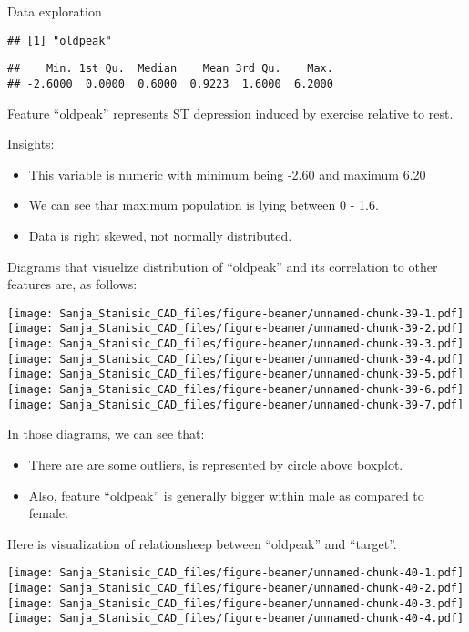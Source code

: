\documentclass[
  ignorenonframetext,
]{beamer}
\begin{document}
\begin{frame}[fragile]{Data exploration}
\begin{verbatim}
## [1] "oldpeak"
\end{verbatim}

\begin{verbatim}
##    Min. 1st Qu.  Median    Mean 3rd Qu.    Max. 
## -2.6000  0.0000  0.6000  0.9223  1.6000  6.2000
\end{verbatim}

Feature ``oldpeak'' represents ST depression induced by exercise
relative to rest.

Insights:

\begin{itemize}
\item
  This variable is numeric with minimum being -2.60 and maximum 6.20
\item
  We can see thar maximum population is lying between 0 - 1.6.
\item
  Data is right skewed, not normally distributed.
\end{itemize}

Diagrams that visuelize distribution of ``oldpeak'' and its correlation
to other features are, as follows:

\texttt{[image: Sanja\_Stanisic\_CAD\_files/figure-beamer/unnamed-chunk-39-1.pdf]}
\texttt{[image: Sanja\_Stanisic\_CAD\_files/figure-beamer/unnamed-chunk-39-2.pdf]}
\texttt{[image: Sanja\_Stanisic\_CAD\_files/figure-beamer/unnamed-chunk-39-3.pdf]}
\texttt{[image: Sanja\_Stanisic\_CAD\_files/figure-beamer/unnamed-chunk-39-4.pdf]}
\texttt{[image: Sanja\_Stanisic\_CAD\_files/figure-beamer/unnamed-chunk-39-5.pdf]}
\texttt{[image: Sanja\_Stanisic\_CAD\_files/figure-beamer/unnamed-chunk-39-6.pdf]}
\texttt{[image: Sanja\_Stanisic\_CAD\_files/figure-beamer/unnamed-chunk-39-7.pdf]}

In those diagrams, we can see that:

\begin{itemize}
\item
  There are are some outliers, is represented by circle above boxplot.
\item
  Also, feature ``oldpeak'' is generally bigger within male as compared
  to female.
\end{itemize}

Here is visualization of relationsheep between ``oldpeak'' and
``target''.

\texttt{[image: Sanja\_Stanisic\_CAD\_files/figure-beamer/unnamed-chunk-40-1.pdf]}
\texttt{[image: Sanja\_Stanisic\_CAD\_files/figure-beamer/unnamed-chunk-40-2.pdf]}
\texttt{[image: Sanja\_Stanisic\_CAD\_files/figure-beamer/unnamed-chunk-40-3.pdf]}
\texttt{[image: Sanja\_Stanisic\_CAD\_files/figure-beamer/unnamed-chunk-40-4.pdf]}


\end{frame}
\end{document}
